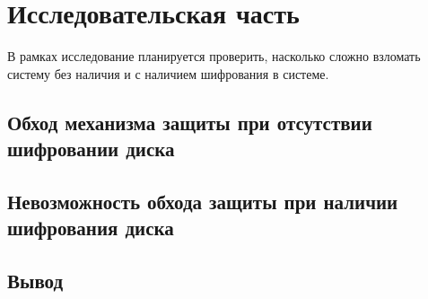 \section{Исследовательская часть}

В рамках исследование планируется проверить, насколько сложно взломать систему без наличия и с наличием шифрования в системе.

\subsection{Обход механизма защиты при отсутствии шифровании диска}

\subsection{Невозможность обхода защиты при наличии шифрования диска}

\subsection*{Вывод}

\pagebreak